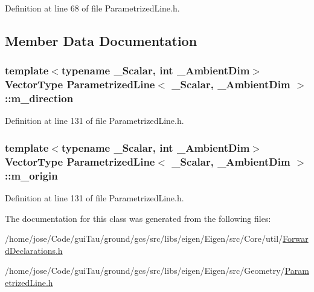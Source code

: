 Definition at line 68 of file Parametrized\-Line.\-h.



\subsection{Member Data Documentation}
\hypertarget{class_parametrized_line_a0c55dd57c800ae31aabfe572e88221c2}{
\subsubsection[{m\-\_\-direction}]{\setlength{\rightskip}{0pt plus 5cm}template$<$typename \-\_\-\-Scalar, int \-\_\-\-Ambient\-Dim$>$ {\bf Vector\-Type} {\bf Parametrized\-Line}$<$ \-\_\-\-Scalar, \-\_\-\-Ambient\-Dim $>$\-::m\-\_\-direction\hspace{0.3cm}{\ttfamily [protected]}}}\label{class_parametrized_line_a0c55dd57c800ae31aabfe572e88221c2}


Definition at line 131 of file Parametrized\-Line.\-h.

\hypertarget{class_parametrized_line_a4a8e8e1f3df3d07c9170ed3a94f81138}{
\subsubsection[{m\-\_\-origin}]{\setlength{\rightskip}{0pt plus 5cm}template$<$typename \-\_\-\-Scalar, int \-\_\-\-Ambient\-Dim$>$ {\bf Vector\-Type} {\bf Parametrized\-Line}$<$ \-\_\-\-Scalar, \-\_\-\-Ambient\-Dim $>$\-::m\-\_\-origin\hspace{0.3cm}{\ttfamily [protected]}}}\label{class_parametrized_line_a4a8e8e1f3df3d07c9170ed3a94f81138}


Definition at line 131 of file Parametrized\-Line.\-h.



The documentation for this class was generated from the following files\-:\begin{DoxyCompactItemize}
\item 
/home/jose/\-Code/gui\-Tau/ground/gcs/src/libs/eigen/\-Eigen/src/\-Core/util/\hyperlink{_forward_declarations_8h}{Forward\-Declarations.\-h}\item 
/home/jose/\-Code/gui\-Tau/ground/gcs/src/libs/eigen/\-Eigen/src/\-Geometry/\hyperlink{_parametrized_line_8h}{Parametrized\-Line.\-h}\end{DoxyCompactItemize}
